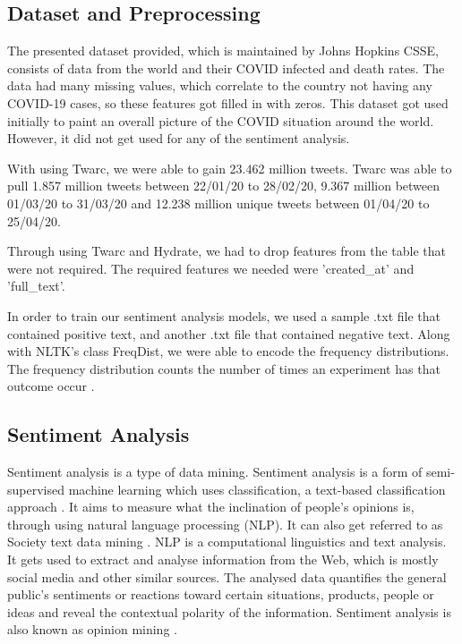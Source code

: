 \documentclass[a4paper,10pt]{article}
\begin{document}
	\subsection{Dataset and Preprocessing}
	
	The presented dataset provided, which is maintained by Johns Hopkins CSSE, consists of data from the world and their COVID infected and death rates. The data had many missing values, which correlate to the country not having any COVID-19 cases, so these features got filled in with zeros. This dataset got used initially to paint an overall picture of the COVID situation around the world. However, it did not get used for any of the sentiment analysis.
	
	With using Twarc, we were able to gain 23.462 million tweets. Twarc was able to pull 1.857 million tweets between 22/01/20 to 28/02/20, 9.367 million between 01/03/20 to 31/03/20 and 12.238 million unique tweets between 01/04/20 to 25/04/20.
	
	Through using Twarc and Hydrate, we had to drop features from the table that were not required. The required features we needed were 'created\_at' and 'full\_text'.
	
	In order to train our sentiment analysis models, we used a sample .txt file that contained positive text, and another .txt file that contained negative text. Along with NLTK's class FreqDist, we were able to encode the frequency distributions. The frequency distribution counts the number of times an experiment has that outcome occur \cite{nltkfreqdist}.
	
	\subsection{Sentiment Analysis}
	Sentiment analysis is a type of data mining. Sentiment analysis is a form of semi-supervised machine learning \cite{tan2016introduction, geron2019hands} which uses classification, a text-based classification approach \cite{jingjingslidesNLP}. It aims to measure what the inclination of people's opinions is, through using natural language processing (NLP). It can also get referred to as Society text data mining \cite{jingjingslidesNLP}. NLP is a computational linguistics and text analysis. It gets used to extract and analyse information from the Web, which is mostly social media and other similar sources. The analysed data quantifies the general public's sentiments or reactions toward certain situations, products, people or ideas and reveal the contextual polarity of the information. Sentiment analysis is also known as opinion mining \cite{towarddatasciencesentiment}.
	
\end{document}

